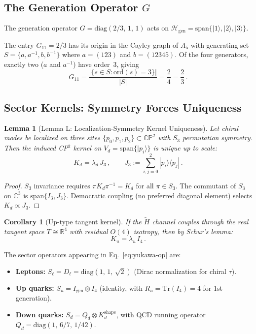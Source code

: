 \documentclass[11pt,a4paper]{article}
\newcommand{\CP}{\mathbb{CP}}
\newcommand{\Tr}{\mathrm{Tr}}
\newtheorem{lemma}[theorem]{Lemma}
\newtheorem{corollary}[theorem]{Corollary}
\begin{document}
\subsection{The Generation Operator $G$}

The generation operator $G = \mathrm{diag}(2/3,\,1,\,1)$ acts on
$\mathcal{H}_{\text{gen}} = \mathrm{span}\{|1\rangle,|2\rangle,|3\rangle\}$.

The entry $G_{11} = 2/3$ has its origin in the Cayley graph of $A_5$ with
generating set $S = \{a,a^{-1},b,b^{-1}\}$ where $a=(123)$ and $b=(12345)$.
Of the four generators, exactly two ($a$ and $a^{-1}$) have order~3, giving
\begin{equation}
G_{11} = \frac{|\{s\in S : \text{ord}(s) = 3\}|}{|S|} = \frac{2}{4} = \frac{2}{3}\,.
\end{equation}

\subsection{Sector Kernels: Symmetry Forces Uniqueness}

\begin{lemma}[Lemma L: Localization-Symmetry Kernel Uniqueness]
\label{lem:L}
Let chiral modes be localized on three sites $\{p_0,p_1,p_2\}\subset\CP^2$
with $S_3$ permutation symmetry.  Then the induced CP$^2$ kernel on
$V_d = \mathrm{span}\{|p_i\rangle\}$ is unique up to scale:
\begin{equation}
K_d = \lambda_d\,J_3\,,\qquad J_3 := \sum_{i,j=0}^{2}|p_i\rangle\langle p_j|\,.
\end{equation}
\end{lemma}

\begin{proof}
$S_3$ invariance requires $\pi K_d \pi^{-1} = K_d$ for all $\pi\in S_3$.
The commutant of $S_3$ on $\mathbb{C}^3$ is $\mathrm{span}\{I_3, J_3\}$.
Democratic coupling (no preferred diagonal element) selects $K_d \propto J_3$.
\end{proof}

\begin{corollary}[Up-type tangent kernel]
If the $\widetilde{H}$ channel couples through the real tangent space
$T\cong\mathbb{R}^4$ with residual $O(4)$ isotropy, then by Schur's lemma:
\begin{equation}
K_u = \lambda_u\,I_4\,.
\end{equation}
\end{corollary}

The sector operators appearing in Eq.~\eqref{eq:yukawa-op} are:
\begin{itemize}
\item \textbf{Leptons:} $S_\ell = D_\ell = \mathrm{diag}(1,\,1,\,\sqrt{2})$
      (Dirac normalization for chiral $\tau$).
\item \textbf{Up quarks:} $S_u = I_{\text{gen}}\otimes I_4$
      (identity, with $R_u = \Tr(I_4) = 4$ for 1st generation).
\item \textbf{Down quarks:} $S_d = Q_d \otimes K_d^{\text{shape}}$,
      with QCD running operator $Q_d = \mathrm{diag}(1,\,6/7,\,1/42)$.
\end{itemize}
\end{document}
